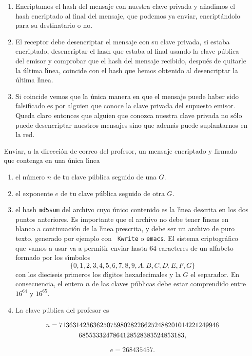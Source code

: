 \begin{enumerate}
\item Encriptamos el hash del mensaje {\sc con nuestra clave privada} y
a\~nadimos el hash encriptado al final del mensaje, que podemos ya enviar, 
encript\'andolo para su destinatario o no.
 
 \item El receptor debe desencriptar el mensaje con su clave privada, si estaba
encriptado,  desencriptar el hash que estaba al final usando la {\sc clave
p\'ublica del emisor} y comprobar que el hash del mensaje recibido, despu\'es de
quitarle la \'ultima l\'{\i}nea, coincide con el hash que hemos obtenido al
desencriptar la \'ultima l\'{\i}nea. 

\item Si coincide vemos que la \'unica manera en que el mensaje puede haber sido
falsificado es por alguien que conoce la clave privada del supuesto emisor.
Queda claro entonces que alguien que conozca nuestra clave privada no s\'olo
puede desencriptar nuestros mensajes sino que adem\'as puede suplantarnos en la
red. 
 \end{enumerate}

\bigskip


\begin{ejer}
Enviar, a la direcci\'on de correo del profesor, un mensaje
encriptado y firmado que contenga en una \'unica l\'{\i}nea 
\begin{enumerate}
 \item el n\'umero $n$ de tu clave p\'ublica seguido de una $G$.
 \item el exponente $e$ de tu clave p\'ublica seguido de otra $G$.
 \item el hash {\tt md5sum} del archivo cuyo \'unico contenido es 
la  l\'{\i}nea descrita en los dos puntos anteriores. Es importante que el
archivo no debe tener l\'{\i}neas en blanco a continuaci\'on de la l\'{\i}nea
prescrita, y debe ser un archivo de puro texto, generado por ejemplo con {\tt
Kwrite} o {\tt emacs}. 
El sistema criptogr\'afico que vamos a usar va a permitir enviar hasta $64$
caracteres de un alfabeto formado por los s\'{\i}mbolos 
\[\{0,1,2,3,4,5,6,7,8,9,A,B,C,D,E,F,G\}\]
\noindent con los dieciseis primeros los d\'{\i}gitos hexadecimales y la $G$ el
separador. En consecuencia, el entero $n$ de las claves p\'ublicas debe estar
comprendido entre $16^{64}$ y $16^{65}$. 
\item La clave p\'ublica del profesor es 

\parbox{10cm}{
\begin{multline}\notag
n=71363142363625075980282266252488201014221249946\\
6855333247864128528383524853183,
\end{multline}
}
\[e=268435457. \] 
 \end{enumerate}
\end{ejer}

